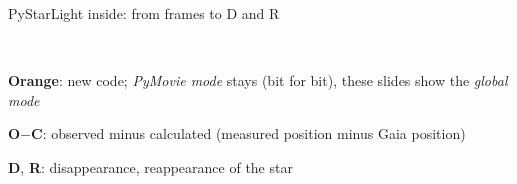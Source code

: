 \begin{frame}{PyStarLight inside: from frames to D and R}
\\[1ex]
  \raggedright\footnotesize
  \begin{tightlist}
    \item \textcolor{syzaccent}{\textbf{Orange}}: new code; \emph{PyMovie mode} stays (bit for bit), these slides
          show the \emph{global mode}
    \item \textbf{O$-$C}: observed minus calculated (measured position minus Gaia position)
    \item \textbf{D}, \textbf{R}: disappearance, reappearance of the star
  \end{tightlist}
\end{frame}

